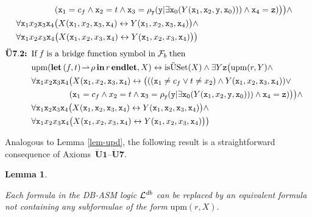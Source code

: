 \documentclass[preprint,11pt]{elsarticle}
\newtheorem{lemma}[theorem]{Lemma}
\theoremstyle{definition}
\theoremstyle{remark}
\begin{document}
\begin{itemize}
\begin{align*}
&\hspace*{1.6cm}(\mathtt{x}_1 = c_f \wedge \mathtt{x}_2 = t \wedge \mathtt{x}_3=\rho_{\mathtt{y}}(\mathtt{y}|\exists \mathtt{x}_0 (Y(\mathtt{x}_1,\mathtt{x}_2,\mathtt{y},\mathtt{x}_0))) \wedge \mathtt{x}_4 = \mathtt{z})\big)\big) \wedge&\\
&\forall \mathtt{x}_1 x_2 \mathtt{x}_3 \mathtt{x}_4 \big(X(\mathtt{x}_1,x_2,\mathtt{x}_3, \mathtt{x}_4) \leftrightarrow Y(\mathtt{x}_1,x_2,\mathtt{x}_3,\mathtt{x}_4)\big) \wedge &\\
&\forall \mathtt{x}_1 x_2 x_3 \mathtt{x}_4 \big(X(\mathtt{x}_1,x_2,x_3, \mathtt{x}_4) \leftrightarrow Y(\mathtt{x}_1,x_2,x_3,\mathtt{x}_4)\big)\big) &
\end{align*}
\begin{align*}
\mathbf{\ddot{U}7.2} \textbf{: } & \text{If} \; f \; \text{is a bridge function symbol in} \; {\cal F}_b \; \text{then}&\\
& \mathrm{upm}(\textbf{let} \, (f,t)\!\rightharpoonup\!\rho \, \textbf{in} \, r \,\textbf{endlet},X) \leftrightarrow \mathrm{is\ddot{U}Set}(X) \wedge \exists Y \mathtt{z} \big(\mathrm{upm}(r,Y) \wedge&\\
&\forall \mathtt{x}_1 x_2 \mathtt{x}_3 \mathtt{x}_4 \big(X(\mathtt{x}_1,x_2,\mathtt{x}_3,\mathtt{x}_4) \leftrightarrow \big(((\mathtt{x}_1 \neq c_f \vee t \neq x_2) \wedge Y(\mathtt{x}_1,x_2,\mathtt{x}_3,\mathtt{x}_4)) \vee &\\
&\hspace*{1.6cm}(\mathtt{x}_1 = c_f \wedge x_2 = t \wedge \mathtt{x}_3=\rho_{\mathtt{y}}(\mathtt{y}|\exists \mathtt{x}_0 (Y(\mathtt{x}_1,x_2,\mathtt{y},\mathtt{x}_0))) \wedge \mathtt{x}_4 = \mathtt{z})\big)\big) \wedge&\\
&\forall \mathtt{x}_1 \mathtt{x}_2 \mathtt{x}_3 \mathtt{x}_4 \big(X(\mathtt{x}_1,\mathtt{x}_2,\mathtt{x}_3, \mathtt{x}_4) \leftrightarrow Y(\mathtt{x}_1,\mathtt{x}_2,\mathtt{x}_3,\mathtt{x}_4)\big) \wedge &\\
&\forall \mathtt{x}_1 x_2 x_3 \mathtt{x}_4 \big(X(\mathtt{x}_1,x_2,x_3, \mathtt{x}_4) \leftrightarrow Y(\mathtt{x}_1,x_2,x_3,\mathtt{x}_4)\big)\big) &
\end{align*}
\end{itemize}


Analogous to Lemma \ref{lem-upd}, the following result is a straightforward consequence of Axioms~$\mathbf{\ddot{U}1}$--$\mathbf{\ddot{U}7}$.

\begin{lemma}\label{lem-upm}

Each formula in the DB-ASM logic ${\cal L}^{db}$ can be replaced by an equivalent formula not containing any subformulae of the form $\mathrm{upm}(r,X)$.

\end{lemma}
\end{document}
